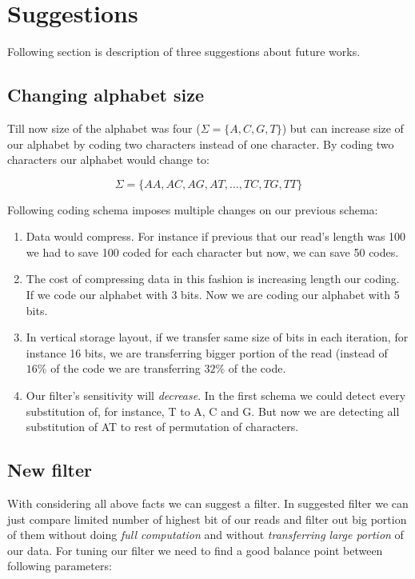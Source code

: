 \section{Suggestions}

Following section is description of three suggestions about future works.

\subsection{Changing alphabet size} \label{alphabet}
Till now size of the alphabet was four ($\Sigma = \{A,C,G,T\}$) but can increase size of our alphabet by coding two characters instead of one character. By coding two characters our alphabet would change to:

\begin{equation}
\nonumber
\Sigma = \{ AA, AC, AG, AT, \dots, TC, TG, TT \}
\end{equation}

Following coding schema imposes multiple changes on our previous schema:

\begin{enumerate}
\item Data would compress. For instance if previous that our read's length was 100 we had to save 100 coded for each character but now, we can save 50 codes.
\item The cost of compressing data in this fashion is increasing length our coding. If we code our alphabet with 3 bits. Now we are coding our alphabet with 5 bits.
\item In vertical storage layout, if we transfer same size of bits in each iteration, for instance 16 bits, we are transferring bigger portion of the read (instead of $16\%$ of the code we are transferring $32\%$ of the code.
\item Our filter's sensitivity will \emph{decrease}. In the first schema we could detect every substitution of, for instance, T to A, C and G. But now we are detecting all substitution of AT to rest of permutation of characters.
\end{enumerate}
 
\subsection{New filter}
With considering all above facts we can suggest a filter. In suggested filter we can just compare limited number of highest bit of our reads and filter out big portion of them without doing \emph{full computation} and without \emph{transferring large portion} of our data. For tuning our filter we need to find a good balance point between following parameters:

